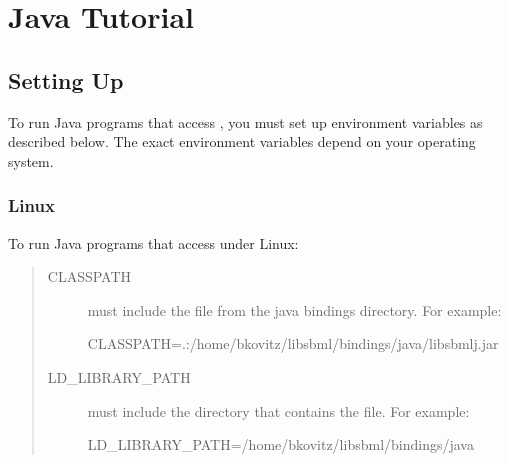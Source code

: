 \documentclass{sbmlmanual}
\begin{document}


\section{Java Tutorial}
\label{sec:java}

\subsection{Setting Up}
\label{sec:java-setting-up}

To run Java programs that access \libsbml{}, you must set up
environment variables as described below.  The exact environment variables
depend on your operating system.

\subsubsection{Linux}
\label{sec:java-linux-setup}

To run Java programs that access \libsbml{} under Linux:

\begin{quote}
\begin{description}

\item[CLASSPATH]
must include the  file from the \libsbml{}
java bindings directory.  For example:

\begin{shellVerbatim}
CLASSPATH=.:/home/bkovitz/libsbml/bindings/java/libsbmlj.jar
\end{shellVerbatim}

\item[LD\_LIBRARY\_PATH]
must include the directory that contains the  file.  For
example:

\begin{shellVerbatim}
LD_LIBRARY_PATH=/home/bkovitz/libsbml/bindings/java
\end{shellVerbatim}

\end{description}
\end{quote}
\end{document}

